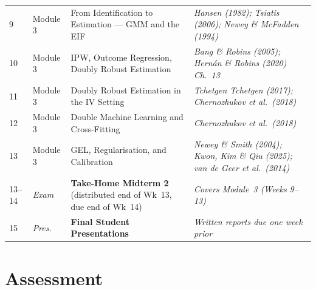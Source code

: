 \documentclass[12pt]{article}
\begin{document}
\begin{longtable}{C{0.6cm} L{1.5cm} L{5.5cm} L{5.8cm}}
  9 & Module 3 & From Identification to Estimation --- GMM and the EIF
    & \textit{Hansen (1982); Tsiatis (2006); Newey \& McFadden (1994)} \\
  10 & Module 3 & IPW, Outcome Regression, Doubly Robust Estimation
    & \textit{Bang \& Robins (2005);
              Hern\'an \& Robins (2020) Ch.~13} \\
  11 & Module 3 & Doubly Robust Estimation in the IV Setting
    & \textit{Tchetgen Tchetgen (2017);
              Chernozhukov et al.\ (2018)} \\
  12 & Module 3 & Double Machine Learning and Cross-Fitting
    & \textit{Chernozhukov et al.\ (2018)} \\
  13 & Module 3 & GEL, Regularisation, and Calibration
    & \textit{Newey \& Smith (2004); Kwon, Kim \& Qiu (2025);
              van de Geer et al.\ (2014)} \\
  \midrule

  13--14 & \textit{Exam} & \textbf{Take-Home Midterm 2}
    (distributed end of Wk~13, due end of Wk~14)
    & \textit{Covers Module~3 (Weeks 9--13)} \\
  \midrule

  15 & \textit{Pres.} & \textbf{Final Student Presentations}
    & \textit{Written reports due one week prior} \\
  \bottomrule
\end{longtable}
\endgroup

\section{Assessment}
\label{sec:assessment}

\begingroup
\small
\setlength{\tabcolsep}{6pt}
\renewcommand{\arraystretch}{1.5}
\end{document}
